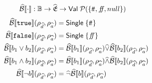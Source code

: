 \begin{align}
    \absboolsem{\cdot} &: \mathbb{B} \rightarrow \ab{\mathfrak{E}} \rightarrow \mathsf{Val} \; \mathcal{P}(\{\true, \false, null\}) \label{eq:bool-operation}
\end{align}
\begin{align}
    \absboolsem{\texttt{true}}(\rho_{\ab{d}}, \rho_{\ab{a}}) &= \mathsf{Single} \; \{\true\} \label{eq:abstract-bool-semantics-start} \\
    \absboolsem{\texttt{false}}(\rho_{\ab{d}}, \rho_{\ab{a}}) &= \mathsf{Single} \; \{\false\} \\
    \absboolsem{b_1 \lor b_2}(\rho_{\ab{d}}, \rho_{\ab{a}}) &= \absboolsem{b_1}(\rho_{\ab{d}}, \rho_{\ab{a}}) \ab{\lor} \absboolsem{b_2}(\rho_{\ab{d}}, \rho_{\ab{a}}) \\
    \absboolsem{b_1 \land b_2}(\rho_{\ab{d}}, \rho_{\ab{a}}) &= \absboolsem{b_1}(\rho_{\ab{d}}, \rho_{\ab{a}}) \ab{\land} \absboolsem{b_2}(\rho_{\ab{d}}, \rho_{\ab{a}}) \\
    \absboolsem{\neg b}(\rho_{\ab{d}}, \rho_{\ab{a}}) &= \ab{\neg} \absboolsem{b}(\rho_{\ab{d}}, \rho_{\ab{a}})
\end{align}



